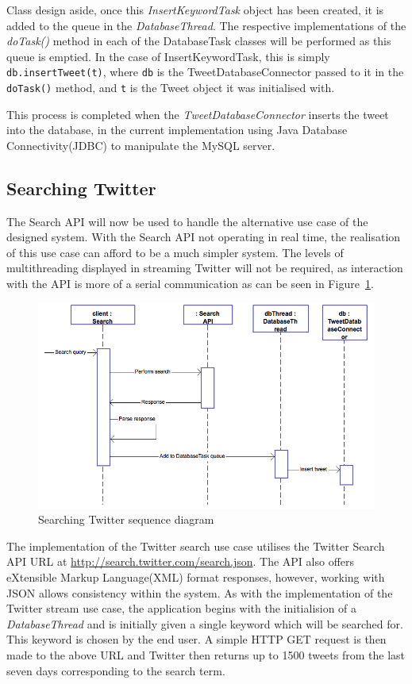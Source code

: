 Class design aside, once this \emph{InsertKeywordTask} object has been created, it is added to the queue in the \emph{DatabaseThread}. The respective implementations of the \emph{doTask()} method in each of the DatabaseTask classes will be performed as this queue is emptied. In the case of InsertKeywordTask, this is simply \texttt{db.insertTweet(t)}, where \texttt{db} is the TweetDatabaseConnector passed to it in the \texttt{doTask()} method, and \texttt{t} is the Tweet object it was initialised with.

This process is completed when the \emph{TweetDatabaseConnector} inserts the tweet into the database, in the current implementation using Java Database Connectivity(JDBC) to manipulate the MySQL server.

\subsection{Searching Twitter}
The Search API will now be used to handle the alternative use case of the designed system. With the Search API not operating in real time, the realisation of this use case can afford to be a much simpler system. The levels of multithreading displayed in streaming Twitter will not be required, as interaction with the API is more of a serial communication as can be seen in Figure~\ref{fig:ucsearch}.

\begin{figure}[h]
\begin{center}
\includegraphics[width=13cm]{ucsearch}
\end{center}
\caption{Searching Twitter sequence diagram}
\label{fig:ucsearch}
\end{figure}

The implementation of the Twitter search use case utilises the Twitter Search API URL at \url{http://search.twitter.com/search.json}. The API also offers eXtensible Markup Language(XML) format responses, however, working with JSON allows consistency within the system. As with the implementation of the Twitter stream use case, the application begins with the initialision of a \emph{DatabaseThread} and is initially given a single keyword which will be searched for. This keyword is chosen by the end user. A simple HTTP GET request is then made to the above URL and Twitter then returns up to 1500 tweets from the last seven days corresponding to the search term.

